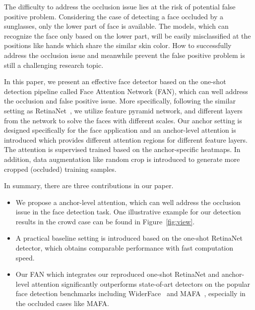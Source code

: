 \documentclass[10pt,twocolumn,letterpaper]{article}
\begin{document}
The difficulty to address the occlusion issue lies at the risk of potential false positive problem. Considering the case of detecting a face occluded by a sunglasses, only the lower part of face is available. The models, which can recognize the face only based on the lower part, will be easily misclassified at the positions like hands which share the similar skin color. How to successfully address the occlusion issue and meanwhile prevent the false positive problem is still a challenging research topic. 


In this paper, we present an effective face detector based on the one-shot detection pipeline called Face Attention Network (FAN), which can well address the occlusion and false positive issue. More specifically, following the similar setting as RetinaNet~\cite{lin2017focal}, we utilize feature pyramid network, and different layers from the network to solve the faces with different scales. Our anchor setting is designed specifically for the face application and an anchor-level attention is introduced which provides different attention regions for different feature layers. The attention is supervised trained based on the anchor-specific heatmaps. In addition, data augmentation like random crop is introduced to generate more cropped (occluded) training samples.


In summary, there are three contributions in our paper. 
\begin{itemize}
\item We propose a anchor-level attention, which can well address the occlusion issue in the face detection task. One illustrative example for our detection results in the crowd case can be found in Figure~\ref{fig:view}.
\item A practical baseline setting is introduced based on the one-shot RetinaNet detector, which obtains comparable performance with fast computation speed. 
\item Our FAN which integrates our reproduced one-shot RetinaNet and anchor-level attention significantly outperforms state-of-art detectors on the popular face detection benchmarks including WiderFace~\cite{yang2016wider} and MAFA~\cite{Ge_2017_CVPR}, especially in the occluded cases like MAFA.
\end{itemize}
 
\end{document}
